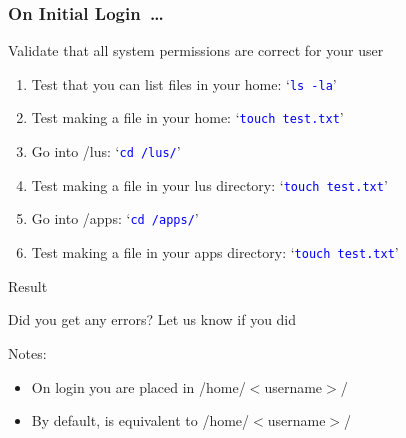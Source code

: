 \begin{frame}
\frametitle{On Initial Login~\ldots}
	Validate that all system permissions are correct for your user~\\
	\begin{enumerate}
		\item Test that you can list files in your home: `\textcolor{blue}{\texttt{ls -la}}'    
		\item Test making a file in your home: `\textcolor{blue}{\texttt{touch test.txt}}'    
		\item Go into \ctilde{}/lus: `\textcolor{blue}{\texttt{cd \ctilde{}/lus/}}'  
		\item Test making a file in your lus directory: `\textcolor{blue}{\texttt{touch test.txt}}'   
		\item Go into \ctilde{}/apps:  `\textcolor{blue}{\texttt{cd \ctilde{}/apps/}}'     
		\item Test making a file in your apps directory: `\textcolor{blue}{\texttt{touch test.txt}}'   
	\end{enumerate}
	\begin{alertblock}{Result}
		\begin{center}Did you get any errors?  Let us know if you did\end{center}
	\end{alertblock}
	\btVFill
	
	\small Notes:
		\begin{itemize}\tiny
		\item On login you are placed in /home/$<$username$>$/
		\item By default, \ctilde{} is equivalent to /home/$<$username$>$/
		\end{itemize}
\end{frame}


